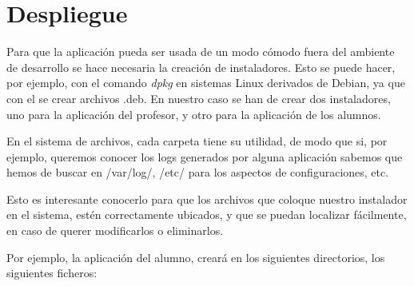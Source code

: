 
\label{chap:despliegue}

\chaptertoc

\section{Despliegue}
\label{sec:despliegue:despliegue}

Para que la aplicación pueda ser usada de un modo cómodo fuera del ambiente de desarrollo se hace necesaria la creación de instaladores. Esto se puede hacer, por ejemplo, con el comando \emph{dpkg} en sistemas Linux derivados de Debian, ya que con el se crear archivos .deb. En nuestro caso se han de crear dos instaladores, uno para la aplicación del profesor, y otro para la aplicación de los alumnos.
\newline

En el sistema de archivos, cada carpeta tiene su utilidad, de modo que si, por ejemplo, queremos conocer los logs generados por alguna aplicación sabemos que hemos de buscar en /var/log/, /etc/ para los aspectos de configuraciones, etc.
\newline

Esto es interesante conocerlo para que los archivos que coloque nuestro instalador en el sistema, estén correctamente ubicados, y que se puedan localizar fácilmente, en caso de querer modificarlos o eliminarlos.
\newline

Por ejemplo, la aplicación del alumno, creará en los siguientes directorios, los siguientes ficheros:

